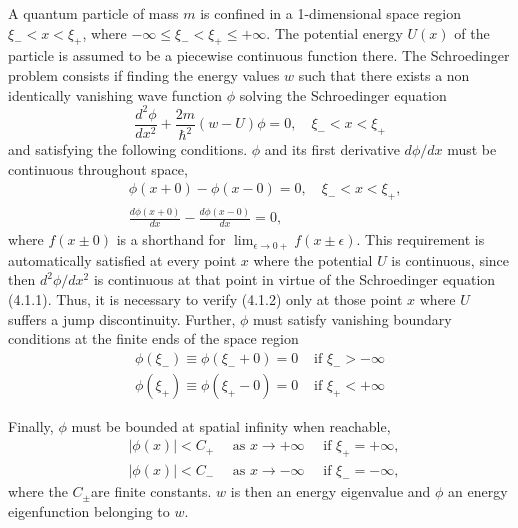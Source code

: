 \documentclass{article}
\begin{document}
A quantum particle of mass $m$ is confined in a 1-dimensional space region $\xi_{-}<x<\xi_{+}$, where $-\infty \leq \xi_{-}<\xi_{+} \leq+\infty$. The potential energy $U(x)$ of the particle is assumed to be a piecewise continuous function there. The Schroedinger problem consists if finding the energy values $w$ such that there exists a non identically vanishing wave function $\phi$ solving the Schroedinger equation
$$
\begin{equation*}
\frac{d^{2} \phi}{d x^{2}}+\frac{2 m}{\hbar^{2}}(w-U) \phi=0, \quad \xi_{-}<x<\xi_{+} \tag{4.1.1}
\end{equation*}
$$
and satisfying the following conditions. $\phi$ and its first derivative $d \phi / d x$ must be continuous throughout space,
$$
\begin{align*}
& \phi(x+0)-\phi(x-0)=0, \quad \xi_{-}<x<\xi_{+},  \tag{4.1.2a}\\
& \frac{d \phi(x+0)}{d x}-\frac{d \phi(x-0)}{d x}=0, \tag{4.1.2b}
\end{align*}
$$
where $f(x \pm 0)$ is a shorthand for $\lim _{\epsilon \rightarrow 0+} f(x \pm \epsilon)$. This requirement is automatically satisfied at every point $x$ where the potential $U$ is continuous, since then $d^{2} \phi / d x^{2}$ is continuous at that point in virtue of the Schroedinger equation (4.1.1). Thus, it is necessary to verify (4.1.2) only at those point $x$ where $U$ suffers a jump discontinuity. Further, $\phi$ must satisfy vanishing boundary conditions at the finite ends of the space region
$$
\begin{array}{ll}
\phi\left(\xi_{-}\right) \equiv \phi\left(\xi_{-}+0\right)=0 & \text { if } \xi_{-}>-\infty \\
\phi\left(\xi_{+}\right) \equiv \phi\left(\xi_{+}-0\right)=0 & \text { if } \xi_{+}<+\infty \tag{4.1.3~b}
\end{array}
$$

Finally, $\phi$ must be bounded at spatial infinity when reachable,
$$
\begin{align*}
& |\phi(x)|<C_{+} \quad \text { as } x \rightarrow+\infty \quad \text { if } \xi_{+}=+\infty \text {, }  \tag{4.1.4a}\\
& |\phi(x)|<C_{-} \quad \text { as } x \rightarrow-\infty \quad \text { if } \xi_{-}=-\infty \text {, } \tag{4.1.4~b}
\end{align*}
$$
where the $C_{ \pm}$are finite constants. $w$ is then an energy eigenvalue and $\phi$ an energy eigenfunction belonging to $w$.
\end{document}
